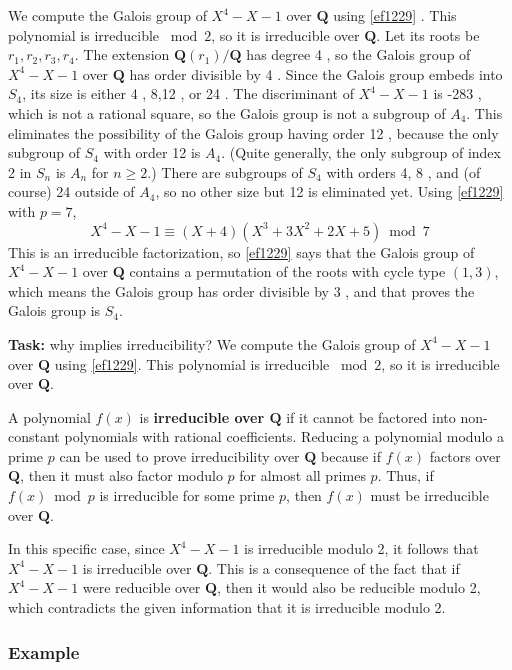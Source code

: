 \begin{example}
We compute the Galois group of $X^4-X-1$ over $\mathbf{Q}$ using \cref{ef1229} .
This polynomial is irreducible $\bmod 2$, so it is irreducible over $\mathbf{Q}$. Let its roots be $r_1, r_2, r_3, r_4$. The extension $\mathbf{Q}\left(r_1\right) / \mathbf{Q}$ has degree 4 , so the Galois group of $X^4-X-1$ over $\mathbf{Q}$ has order divisible by 4 . Since the Galois group embeds into $S_4$, its size is either 4 , 8,12 , or 24 . The discriminant of $X^4-X-1$ is -283 , which is not a rational square, so the Galois group is not a subgroup of $A_4$. This eliminates the possibility of the Galois group having order 12 , because the only subgroup of $S_4$ with order 12 is $A_4$. (Quite generally, the only subgroup of index 2 in $S_n$ is $A_n$ for $n \geq 2$.) There are subgroups of $S_4$ with orders 4, 8 , and (of course) 24 outside of $A_4$, so no other size but 12 is eliminated yet.
Using \cref{ef1229}  with $p=7$,
\[
X^4-X-1 \equiv(X+4)\left(X^3+3 X^2+2 X+5\right) \bmod 7
\]This is an irreducible factorization, so \cref{ef1229}  says that the Galois group of $X^4-X-1$ over $\mathbf{Q}$ contains a permutation of the roots with cycle type $(1,3)$, which means the Galois group has order divisible by 3 , and that proves the Galois group is $S_4$.
\end{example}
\textbf{Task:} why implies irreducibility? We compute the Galois group of $X^4-X-1$ over $\mathbf{Q}$ using \cref{ef1229}. This polynomial is irreducible $\bmod 2$, so it is irreducible over $\mathbf{Q}$.

A polynomial $f(x)$ is \textbf{irreducible over $\mathbf{Q}$} if it cannot be factored into non-constant polynomials with rational coefficients. Reducing a polynomial modulo a prime $p$ can be used to prove irreducibility over $\mathbf{Q}$ because if $f(x)$ factors over $\mathbf{Q}$, then it must also factor modulo $p$ for almost all primes $p$. Thus, if $f(x) \bmod p$ is irreducible for some prime $p$, then $f(x)$ must be irreducible over $\mathbf{Q}$.

In this specific case, since $X^4 - X - 1$ is irreducible modulo 2, it follows that $X^4 - X - 1$ is irreducible over $\mathbf{Q}$. This is a consequence of the fact that if $X^4 - X - 1$ were reducible over $\mathbf{Q}$, then it would also be reducible modulo 2, which contradicts the given information that it is irreducible modulo 2.

\subsubsection{Example}

